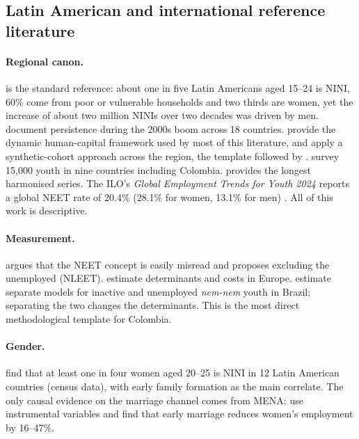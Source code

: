 \documentclass[11pt]{article}
\begin{document}
\subsection{Latin American and international reference literature}

\paragraph{Regional canon.} \citet{dehoyos2016} is the standard reference: about one in five Latin Americans aged 15--24 is NINI, 60\% come from poor or vulnerable households and two thirds are women, yet the increase of about two million NINIs over two decades was driven by men. \citet{cardenas2015} document persistence during the 2000s boom across 18 countries. \citet{behrman2014} provide the dynamic human-capital framework used by most of this literature, and \citet{szekely2015} apply a synthetic-cohort approach across the region, the template followed by \citet{lasso2026}. \citet{novella2018} survey 15,000 youth in nine countries including Colombia. \citet{tornarolli2017} provides the longest harmonised series. The ILO's \textit{Global Employment Trends for Youth 2024} reports a global NEET rate of 20.4\% (28.1\% for women, 13.1\% for men) \citep{iloget2024}. All of this work is descriptive.

\paragraph{Measurement.} \citet{elder2015} argues that the NEET concept is easily misread and proposes excluding the unemployed (NLEET). \citet{eurofound2012} estimate determinants and costs in Europe. \citet{freire2021} estimate separate models for inactive and unemployed \textit{nem-nem} youth in Brazil; separating the two changes the determinants. This is the most direct methodological template for Colombia.

\paragraph{Gender.} \citet{liu2023} find that at least one in four women aged 20--25 is NINI in 12 Latin American countries (census data), with early family formation as the main correlate. The only causal evidence on the marriage channel comes from MENA: \citet{assaad2017} use instrumental variables and find that early marriage reduces women's employment by 16--47\%.
\end{document}
